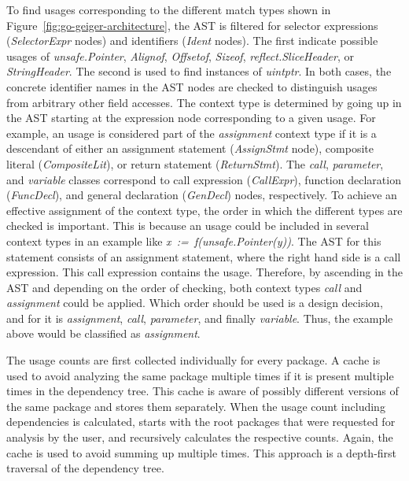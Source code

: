 To find \unsafe{} usages corresponding to the different match types shown in Figure~\ref{fig:go-geiger-architecture},
the \acrshort{AST} is filtered for selector expressions (\textit{SelectorExpr} nodes) and identifiers (\textit{Ident}
nodes).
The first indicate possible usages of \textit{unsafe.Pointer}, \textit{Alignof}, \textit{Offsetof}, \textit{Sizeof},
\textit{reflect.SliceHeader}, or \textit{StringHeader}.
The second is used to find instances of \textit{uintptr}.
In both cases, the concrete identifier names in the \acrshort{AST} nodes are checked to distinguish \unsafe{} usages from
arbitrary other field accesses.
The context type is determined by going up in the \acrshort{AST} starting at the expression node corresponding to a
given \unsafe{} usage.
For example, an \unsafe{} usage is considered part of the \textit{assignment} context type if it is a descendant of
either an assignment statement (\textit{AssignStmt} node), composite literal (\textit{CompositeLit}), or return
statement (\textit{ReturnStmt}).
The \textit{call}, \textit{parameter}, and \textit{variable} classes correspond to call expression (\textit{CallExpr}),
function declaration (\textit{FuncDecl}), and general declaration (\textit{GenDecl}) nodes, respectively.
To achieve an effective assignment of the context type, the order in which the different types are checked is important.
This is because an \unsafe{} usage could be included in several context types in an example like
\textit{x~:=~f(unsafe.Pointer(y))}.
The \acrshort{AST} for this statement consists of an assignment statement, where the right hand side is a call
expression.
This call expression contains the \unsafe{} usage.
Therefore, by ascending in the \acrshort{AST} and depending on the order of checking, both context types \textit{call}
and \textit{assignment} could be applied.
Which order should be used is a design decision, and for \toolGeiger{} it is \textit{assignment}, \textit{call},
\textit{parameter}, and finally \textit{variable}.
Thus, the example above would be classified as \textit{assignment}.

The \unsafe{} usage counts are first collected individually for every package.
A cache is used to avoid analyzing the same package multiple times if it is present multiple times in the dependency
tree.
This cache is aware of possibly different versions of the same package and stores them separately.
When the usage count including dependencies is calculated, \toolGeiger{} starts with the root packages that were
requested for analysis by the user, and recursively calculates the respective counts.
Again, the cache is used to avoid summing up multiple times.
This approach is a depth-first traversal of the dependency tree.


